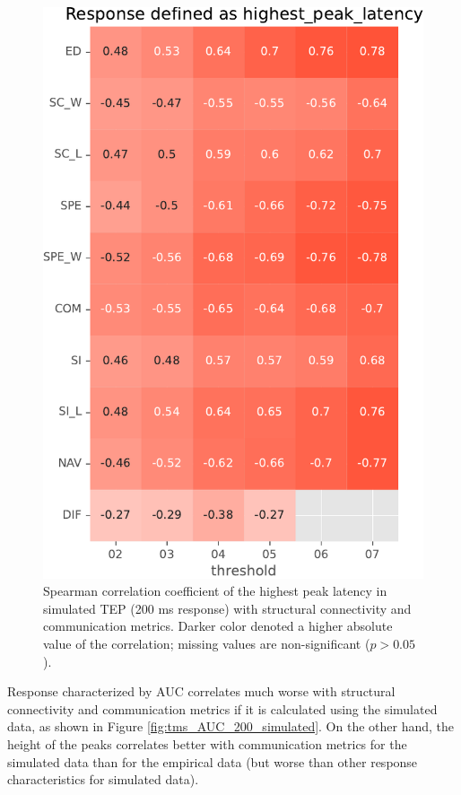 \begin{figure}
    \centering
    \includegraphics[height=\textwidth]{images/nootebook_generated/tmseeg_results/simulated/200/not_over_threshold_nan/Response defined as highest_peak_latency.pdf}
    \caption[TEPs highest peak latency (200 ms) correlations (simulated data)]{Spearman correlation coefficient of the highest peak latency in simulated TEP (200 ms response) with structural connectivity and communication metrics. Darker color denoted a higher absolute value of the correlation; missing values are non-significant ($p>0.05$).}
    \label{fig:tms_highest_time_200_simulated}
\end{figure}

Response characterized by AUC correlates much worse with structural connectivity and communication metrics if it is calculated using the simulated data, as shown in Figure \ref{fig:tms_AUC_200_simulated}. On the other hand, the height of the peaks correlates better with communication metrics for the simulated data than for the empirical data (but worse than other response characteristics for simulated data). 


